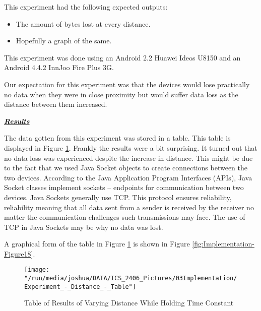 \documentclass[12pt,svgnames,smaller]{article} %
\begin{document}
	This experiment had the following expected outputs:
	
	\begin{itemize}
		\item The amount of bytes lost at every distance.
		\item Hopefully a graph of the same.
	\end{itemize}
	
	This experiment was done using an Android 2.2 Huawei Ideos U8150 and an Android 4.4.2 InnJoo Fire Plus 3G.
	
	Our expectation for this experiment was that the devices would lose practically no data when they were in close proximity but would suffer data loss as the distance between them increased.
	
	
	\textbf{\textit{\underline{Results}}}
	
	The data gotten from this experiment was stored in a table. This table is displayed in Figure \ref{fig:Implementation-Figure17}. Frankly the results were a bit surprising. It turned out that no data loss was experienced despite the increase in distance. This might be due to the fact that we used Java Socket objects to create connections between the two devices. According to the Java Application Program Interfaces (APIs), Java Socket classes implement sockets – endpoints  for communication between two devices. Java Sockets generally use TCP. This protocol ensures reliability, reliability meaning that all data sent from a sender is received by the receiver no matter the communication challenges such transmissions may face. The use of TCP in Java Sockets may be why no data was lost.
	
	A graphical form of the table in Figure \ref{fig:Implementation-Figure17} is shown in Figure \ref{fig:Implementation-Figure18}.
	
	\begin{figure}
		\centering
		\texttt{[image: "/run/media/joshua/DATA/ICS\_2406\_Pictures/03Implementation/Experiment\_-\_Distance\_-\_Table"]}
			\caption{Table of Results of Varying Distance While Holding Time Constant}
			\label{fig:Implementation-Figure17}			
	\end{figure} 
\end{document}
